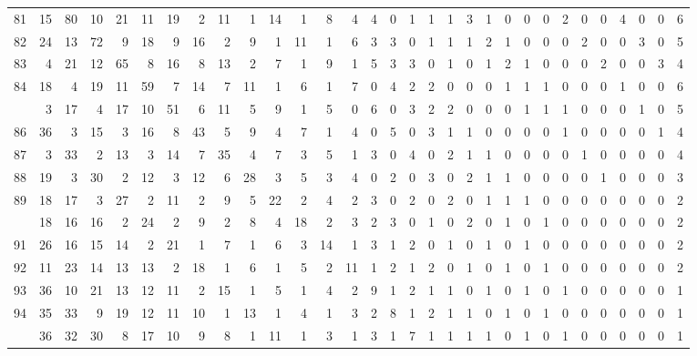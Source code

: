 \documentclass[
]{article}
\begin{document}
\begin{longtable}[t]{lrrrrrrrrrrrrrrrrrrrrrrrrrrrrrr}
81 & 15 & 80 & 10 & 21 & 11 & 19 & 2 & 11 & 1 & 14 & 1 & 8 & 4 & 4 & 0 & 1 & 1 & 1 & 3 & 1 & 0 & 0 & 0 & 2 & 0 & 0 & 4 & 0 & 0 & 6\\
82 & 24 & 13 & 72 & 9 & 18 & 9 & 16 & 2 & 9 & 1 & 11 & 1 & 6 & 3 & 3 & 0 & 1 & 1 & 1 & 2 & 1 & 0 & 0 & 0 & 2 & 0 & 0 & 3 & 0 & 5\\
83 & 4 & 21 & 12 & 65 & 8 & 16 & 8 & 13 & 2 & 7 & 1 & 9 & 1 & 5 & 3 & 3 & 0 & 1 & 0 & 1 & 2 & 1 & 0 & 0 & 0 & 2 & 0 & 0 & 3 & 4\\
84 & 18 & 4 & 19 & 11 & 59 & 7 & 14 & 7 & 11 & 1 & 6 & 1 & 7 & 0 & 4 & 2 & 2 & 0 & 0 & 0 & 1 & 1 & 1 & 0 & 0 & 0 & 1 & 0 & 0 & 6\\
\addlinespace
85 & 3 & 17 & 4 & 17 & 10 & 51 & 6 & 11 & 5 & 9 & 1 & 5 & 0 & 6 & 0 & 3 & 2 & 2 & 0 & 0 & 0 & 1 & 1 & 1 & 0 & 0 & 0 & 1 & 0 & 5\\
86 & 36 & 3 & 15 & 3 & 16 & 8 & 43 & 5 & 9 & 4 & 7 & 1 & 4 & 0 & 5 & 0 & 3 & 1 & 1 & 0 & 0 & 0 & 0 & 1 & 0 & 0 & 0 & 0 & 1 & 4\\
87 & 3 & 33 & 2 & 13 & 3 & 14 & 7 & 35 & 4 & 7 & 3 & 5 & 1 & 3 & 0 & 4 & 0 & 2 & 1 & 1 & 0 & 0 & 0 & 0 & 1 & 0 & 0 & 0 & 0 & 4\\
88 & 19 & 3 & 30 & 2 & 12 & 3 & 12 & 6 & 28 & 3 & 5 & 3 & 4 & 0 & 2 & 0 & 3 & 0 & 2 & 1 & 1 & 0 & 0 & 0 & 0 & 1 & 0 & 0 & 0 & 3\\
89 & 18 & 17 & 3 & 27 & 2 & 11 & 2 & 9 & 5 & 22 & 2 & 4 & 2 & 3 & 0 & 2 & 0 & 2 & 0 & 1 & 1 & 1 & 0 & 0 & 0 & 0 & 0 & 0 & 0 & 2\\
\addlinespace
90 & 18 & 16 & 16 & 2 & 24 & 2 & 9 & 2 & 8 & 4 & 18 & 2 & 3 & 2 & 3 & 0 & 1 & 0 & 2 & 0 & 1 & 0 & 1 & 0 & 0 & 0 & 0 & 0 & 0 & 2\\
91 & 26 & 16 & 15 & 14 & 2 & 21 & 1 & 7 & 1 & 6 & 3 & 14 & 1 & 3 & 1 & 2 & 0 & 1 & 0 & 1 & 0 & 1 & 0 & 0 & 0 & 0 & 0 & 0 & 0 & 2\\
92 & 11 & 23 & 14 & 13 & 13 & 2 & 18 & 1 & 6 & 1 & 5 & 2 & 11 & 1 & 2 & 1 & 2 & 0 & 1 & 0 & 1 & 0 & 1 & 0 & 0 & 0 & 0 & 0 & 0 & 2\\
93 & 36 & 10 & 21 & 13 & 12 & 11 & 2 & 15 & 1 & 5 & 1 & 4 & 2 & 9 & 1 & 2 & 1 & 1 & 0 & 1 & 0 & 1 & 0 & 1 & 0 & 0 & 0 & 0 & 0 & 1\\
94 & 35 & 33 & 9 & 19 & 12 & 11 & 10 & 1 & 13 & 1 & 4 & 1 & 3 & 2 & 8 & 1 & 2 & 1 & 1 & 0 & 1 & 0 & 1 & 0 & 0 & 0 & 0 & 0 & 0 & 1\\
\addlinespace
95 & 36 & 32 & 30 & 8 & 17 & 10 & 9 & 8 & 1 & 11 & 1 & 3 & 1 & 3 & 1 & 7 & 1 & 1 & 1 & 1 & 0 & 1 & 0 & 1 & 0 & 0 & 0 & 0 & 0 & 1\\

\end{longtable}
\end{document}

